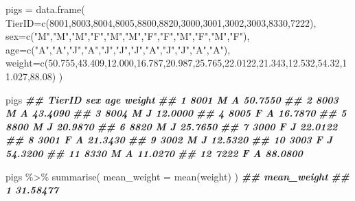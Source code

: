 \documentclass[
]{book}
\newenvironment{Shaded}{\begin{snugshade}}{\end{snugshade}}
\newcommand{\AttributeTok}[1]{\textcolor[rgb]{0.77,0.63,0.00}{#1}}
\newcommand{\DecValTok}[1]{\textcolor[rgb]{0.00,0.00,0.81}{#1}}
\newcommand{\DocumentationTok}[1]{\textcolor[rgb]{0.56,0.35,0.01}{\textbf{\textit{#1}}}}
\newcommand{\FloatTok}[1]{\textcolor[rgb]{0.00,0.00,0.81}{#1}}
\newcommand{\FunctionTok}[1]{\textcolor[rgb]{0.00,0.00,0.00}{#1}}
\newcommand{\NormalTok}[1]{#1}
\newcommand{\OtherTok}[1]{\textcolor[rgb]{0.56,0.35,0.01}{#1}}
\newcommand{\SpecialCharTok}[1]{\textcolor[rgb]{0.00,0.00,0.00}{#1}}
\newcommand{\StringTok}[1]{\textcolor[rgb]{0.31,0.60,0.02}{#1}}
\begin{document}
\begin{Shaded}
\begin{Highlighting}[]
\NormalTok{pigs }\OtherTok{=} \FunctionTok{data.frame}\NormalTok{(}
  \AttributeTok{TierID=}\FunctionTok{c}\NormalTok{(}\DecValTok{8001}\NormalTok{,}\DecValTok{8003}\NormalTok{,}\DecValTok{8004}\NormalTok{,}\DecValTok{8005}\NormalTok{,}\DecValTok{8800}\NormalTok{,}\DecValTok{8820}\NormalTok{,}\DecValTok{3000}\NormalTok{,}\DecValTok{3001}\NormalTok{,}\DecValTok{3002}\NormalTok{,}\DecValTok{3003}\NormalTok{,}\DecValTok{8330}\NormalTok{,}\DecValTok{7222}\NormalTok{),}
  \AttributeTok{sex=}\FunctionTok{c}\NormalTok{(}\StringTok{"M"}\NormalTok{,}\StringTok{"M"}\NormalTok{,}\StringTok{"M"}\NormalTok{,}\StringTok{"F"}\NormalTok{,}\StringTok{"M"}\NormalTok{,}\StringTok{"M"}\NormalTok{,}\StringTok{"F"}\NormalTok{,}\StringTok{"F"}\NormalTok{,}\StringTok{"M"}\NormalTok{,}\StringTok{"F"}\NormalTok{,}\StringTok{"M"}\NormalTok{,}\StringTok{"F"}\NormalTok{),}
  \AttributeTok{age=}\FunctionTok{c}\NormalTok{(}\StringTok{"A"}\NormalTok{,}\StringTok{"A"}\NormalTok{,}\StringTok{"J"}\NormalTok{,}\StringTok{"A"}\NormalTok{,}\StringTok{"J"}\NormalTok{,}\StringTok{"J"}\NormalTok{,}\StringTok{"J"}\NormalTok{,}\StringTok{"A"}\NormalTok{,}\StringTok{"J"}\NormalTok{,}\StringTok{"J"}\NormalTok{,}\StringTok{"A"}\NormalTok{,}\StringTok{"A"}\NormalTok{),}
  \AttributeTok{weight=}\FunctionTok{c}\NormalTok{(}\FloatTok{50.755}\NormalTok{,}\FloatTok{43.409}\NormalTok{,}\FloatTok{12.000}\NormalTok{,}\FloatTok{16.787}\NormalTok{,}\FloatTok{20.987}\NormalTok{,}\FloatTok{25.765}\NormalTok{,}\FloatTok{22.0122}\NormalTok{,}\FloatTok{21.343}\NormalTok{,}\FloatTok{12.532}\NormalTok{,}\FloatTok{54.32}\NormalTok{,}\FloatTok{11.027}\NormalTok{,}\FloatTok{88.08}\NormalTok{)}
\NormalTok{)}

\NormalTok{pigs}
\DocumentationTok{\#\#    TierID sex age  weight}
\DocumentationTok{\#\# 1    8001   M   A 50.7550}
\DocumentationTok{\#\# 2    8003   M   A 43.4090}
\DocumentationTok{\#\# 3    8004   M   J 12.0000}
\DocumentationTok{\#\# 4    8005   F   A 16.7870}
\DocumentationTok{\#\# 5    8800   M   J 20.9870}
\DocumentationTok{\#\# 6    8820   M   J 25.7650}
\DocumentationTok{\#\# 7    3000   F   J 22.0122}
\DocumentationTok{\#\# 8    3001   F   A 21.3430}
\DocumentationTok{\#\# 9    3002   M   J 12.5320}
\DocumentationTok{\#\# 10   3003   F   J 54.3200}
\DocumentationTok{\#\# 11   8330   M   A 11.0270}
\DocumentationTok{\#\# 12   7222   F   A 88.0800}

\NormalTok{pigs }\SpecialCharTok{\%\textgreater{}\%}
    \FunctionTok{summarise}\NormalTok{(         }
    \AttributeTok{mean\_weight =} \FunctionTok{mean}\NormalTok{(weight)}
\NormalTok{  )}
\DocumentationTok{\#\#   mean\_weight}
\DocumentationTok{\#\# 1    31.58477}


\end{Highlighting}
\end{Shaded}
\end{document}
